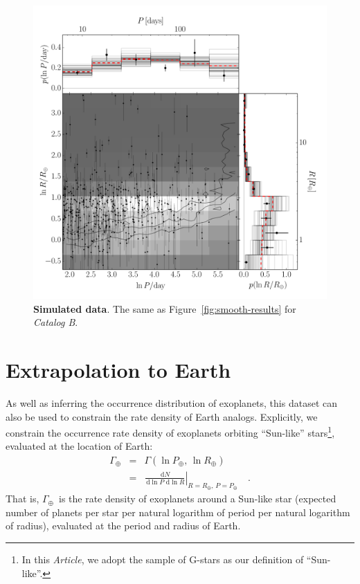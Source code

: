 \documentclass[12pt,preprint]{aastex}
\newcommand{\paper}{\textsl{Article}}
\newcommand{\figref}[1]{\ref{fig:#1}}
\newcommand{\Fig}[1]{Figure~\figref{#1}}
\newcommand{\fig}[1]{\Fig{#1}}
\newcommand{\figlabel}[1]{\label{fig:#1}}
\newcommand{\eqlabel}[1]{\label{eq:#1}}
\newcommand{\sectlabel}[1]{\label{sect:#1}}
\newcommand{\dd}{\ensuremath{\,\mathrm{d}}}
\newcommand{\rate}{\ensuremath{\Gamma}}
\newcommand{\radius}{\ensuremath{R}}
\newcommand{\period}{\ensuremath{P}}
\newcommand{\modelb}{\emph{Catalog B}}
\newcommand{\gammaearth}{{\ensuremath{\rate_\oplus}}}
\begin{document}
\begin{figure}[p]
\begin{center}
\includegraphics[width=\textwidth]{figures/simulation/results.pdf}
\end{center}
\caption{%
{\bf Simulated data}.
The same as \fig{smooth-results} for \modelb.
\figlabel{simulation-results}}
\end{figure}

\section{Extrapolation to Earth}
\sectlabel{extrap}

As well as inferring the occurrence distribution of exoplanets, this dataset
can also be used to constrain the rate density of Earth analogs.
Explicitly, we constrain the occurrence rate density of exoplanets orbiting
``Sun-like'' stars\footnote{In this \paper, we adopt the \citet{petigura}
sample of G-stars as our definition of ``Sun-like''.}, evaluated at the
location of Earth:
\begin{eqnarray}\eqlabel{gammaearth}
\gammaearth &=& \rate (\ln\period_\oplus,\,\ln\radius_\oplus) \\
&=&
\left.\frac{\dd N}{\dd\ln\period\,\dd\ln\radius}\right|
_{\radius=\radius_\oplus,\,\period=\period_\oplus}\quad.
\end{eqnarray}
That is, \gammaearth\ is the rate density of exoplanets around a Sun-like
star (expected number of planets per star per natural logarithm of period per
natural logarithm of radius), evaluated at the period and radius of Earth.
\end{document}
